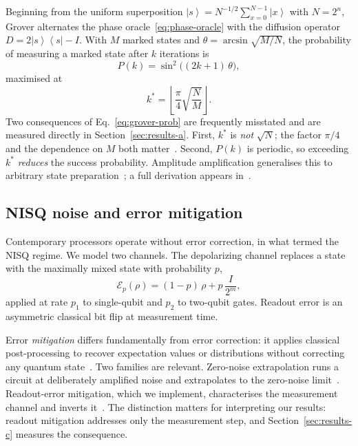 \documentclass[11pt,a4paper]{article}
\newcommand{\ket}[1]{\left|#1\right\rangle}
\newcommand{\bra}[1]{\left\langle#1\right|}
\begin{document}
Beginning from the uniform superposition
$\ket{s} = N^{-1/2}\sum_{x=0}^{N-1}\ket{x}$ with $N = 2^n$, Grover alternates
the phase oracle~\eqref{eq:phase-oracle} with the diffusion operator
$D = 2\ket{s}\!\bra{s} - I$. With $M$ marked states and
$\theta = \arcsin\sqrt{M/N}$, the probability of measuring a marked state after
$k$ iterations is
\begin{equation}
  P(k) = \sin^2\!\big((2k+1)\,\theta\big),
  \label{eq:grover-prob}
\end{equation}
maximised at
\begin{equation}
  k^\ast = \left\lfloor \frac{\pi}{4}\sqrt{\frac{N}{M}} \right\rfloor .
  \label{eq:kstar}
\end{equation}
Two consequences of Eq.~\eqref{eq:grover-prob} are frequently misstated and are
measured directly in Section~\ref{sec:results-a}. First, $k^\ast$ is
\emph{not} $\sqrt{N}$; the factor $\pi/4$ and the dependence on $M$ both
matter~\citep{boyer1998}. Second, $P(k)$ is periodic, so exceeding $k^\ast$
\emph{reduces} the success probability. Amplitude amplification generalises this
to arbitrary state preparation~\citep{brassard2002}; a full derivation appears
in~\citet[Ch.~6]{nielsen2010}.

\subsection{NISQ noise and error mitigation}

Contemporary processors operate without error correction, in what
\citet{preskill2018} termed the NISQ regime. We model two channels. The
depolarizing channel replaces a state with the maximally mixed state with
probability $p$,
\begin{equation}
  \mathcal{E}_p(\rho) = (1-p)\,\rho + p\,\frac{I}{2^m},
\end{equation}
applied at rate $p_1$ to single-qubit and $p_2$ to two-qubit gates. Readout
error is an asymmetric classical bit flip at measurement time.

Error \emph{mitigation} differs fundamentally from error correction: it applies
classical post-processing to recover expectation values or distributions
without correcting any quantum state~\citep{cai2023}. Two families are
relevant. Zero-noise extrapolation runs a circuit at deliberately amplified
noise and extrapolates to the zero-noise
limit~\citep{temme2017,li2017,kandala2019}. Readout-error mitigation, which we
implement, characterises the measurement channel and inverts
it~\citep{bravyi2021,nation2021}. The distinction matters for interpreting our
results: readout mitigation addresses only the measurement step, and
Section~\ref{sec:results-c} measures the consequence.
\end{document}
